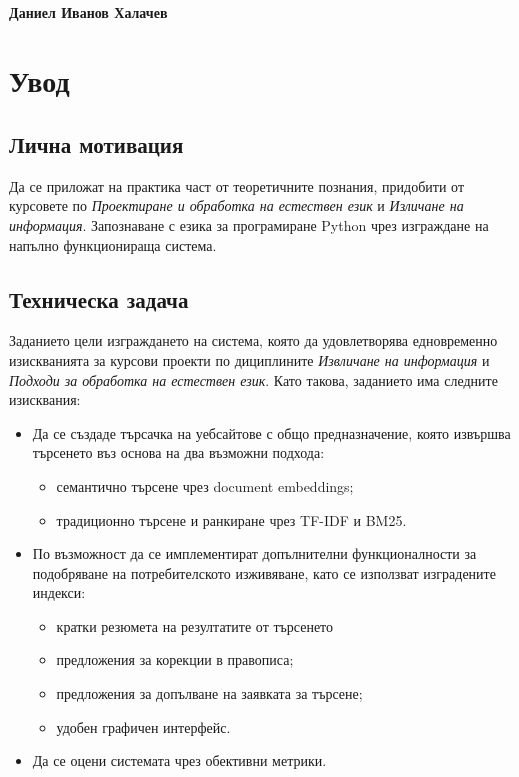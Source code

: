 \documentclass[a4paper,12pt]{article} \usepackage[utf8]{inputenc}
\begin{document}
\paragraph{Даниел Иванов Халачев} \newpage

\section{Увод}

\subsection{Лична мотивация} Да се приложат на практика част от теоретичните
познания, придобити от курсовете по \textit{Проектиране и обработка на естествен
език} и \textit{Изличане на информация}. Запознаване с езика за програмиране
Python чрез изграждане на напълно функционираща система.

\subsection{Техническа задача} Заданието цели изграждането на система, която да
удовлетворява едновременно изискванията за курсови проекти по дициплините
\emph{Извличане на информация} и \emph{Подходи за обработка на естествен език}.
Като такова, заданието има следните изисквания: \begin{itemize} \item Да се
създаде търсачка на уебсайтове с общо предназначение, която извършва търсенето
въз основа на два възможни подхода: \begin{itemize} \item семантично търсене
чрез document embeddings; \item традиционно търсене и ранкиране чрез TF-IDF и
BM25. \end{itemize} \item По възможност да се имплементират допълнителни
функционалности за подобряване на потребителското изживяване, като се използват
изградените индекси: \begin{itemize} \item кратки резюмета на резултатите от
търсенето \item предложения за корекции в правописа; \item предложения за
допълване на заявката за търсене; \item удобен графичен интерфейс. \end{itemize}
\item Да се оцени системата чрез обективни метрики. \end{itemize}
\end{document}
